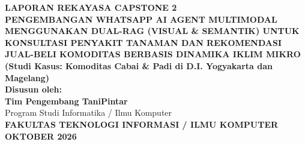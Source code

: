 \documentclass[11pt,a4paper]{article}
\begin{document}
\begin{titlepage}
    \centering
    \vspace*{1cm}
    {\Large \textbf{LAPORAN REKAYASA CAPSTONE 2}}\\[0.8cm]
    {\LARGE \textbf{PENGEMBANGAN WHATSAPP AI AGENT MULTIMODAL MENGGUNAKAN DUAL-RAG (VISUAL \& SEMANTIK) UNTUK KONSULTASI PENYAKIT TANAMAN DAN REKOMENDASI JUAL-BELI KOMODITAS BERBASIS DINAMIKA IKLIM MIKRO}}\\[0.5cm]
    {\large \textbf{(Studi Kasus: Komoditas Cabai \& Padi di D.I. Yogyakarta dan Magelang)}}\\[2cm]

    \textbf{Disusun oleh:}\\
    {\large \textbf{Tim Pengembang TaniPintar}}\\[0.3cm]
    Program Studi Informatika / Ilmu Komputer\\[2.5cm]

    \vfill
    {\large \textbf{FAKULTAS TEKNOLOGI INFORMASI / ILMU KOMPUTER}}\\[0.2cm]
    {\large \textbf{OKTOBER 2026}}
\end{titlepage}
\end{document}
